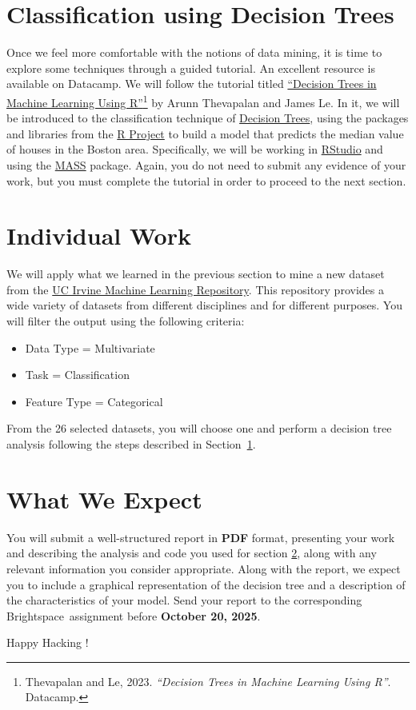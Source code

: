 \documentclass{article}
\begin{document}
\section{Classification using Decision Trees}\label{sec:tree}
Once we feel more comfortable with the notions of data mining, it is time to explore some techniques through a guided tutorial. An excellent resource is available on Datacamp. We will follow the tutorial titled \href{https://www.datacamp.com/tutorial/decision-trees-R}{``Decision Trees in Machine Learning Using R''}\footnote{Thevapalan and Le, 2023. \textit{``Decision Trees in Machine Learning Using R''}. Datacamp.} by Arunn Thevapalan and James Le. In it, we will be introduced to the classification technique of \href{https://en.wikipedia.org/wiki/Decision_tree}{Decision Trees}, using the packages and libraries from the \href{https://www.r-project.org/}{R Project} to build a model that predicts the median value of houses in the Boston area. Specifically, we will be working in \href{https://posit.co/download/rstudio-desktop/}{RStudio} and using the \href{https://cran.r-project.org/web/packages/MASS/index.html}{MASS} package. Again, you do not need to submit any evidence of your work, but you must complete the tutorial in order to proceed to the next section.

\section{Individual Work} \label{sec:work}
We will apply what we learned in the previous section to mine a new dataset from the \href{https://archive.ics.uci.edu/datasets}{UC Irvine Machine Learning Repository}. This repository provides a wide variety of datasets from different disciplines and for different purposes. You will filter the output using the following criteria:

\begin{itemize}
    \item Data Type = Multivariate
    \item Task = Classification
    \item Feature Type = Categorical
\end{itemize}

From the 26 selected datasets, you will choose one and perform a decision tree analysis following the steps described in Section~\ref{sec:tree}.

\section{What We Expect}
You will submit a well-structured report in \textbf{PDF} format, presenting your work and describing the analysis and code you used for section \ref{sec:work}, along with any relevant information you consider appropriate. Along with the report, we expect you to include a graphical representation of the decision tree and a description of the characteristics of your model. Send your report to the corresponding Brightspace\texttrademark ~assignment before \textbf{October 20, 2025}.

\vspace{5mm}
Happy Hacking !
\end{document}
